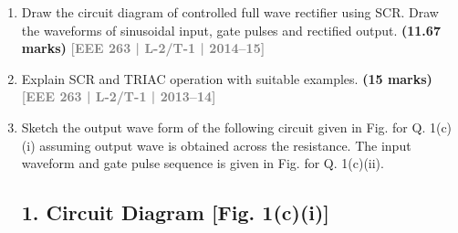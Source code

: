 \documentclass[12pt]{article}
\newcommand{\yr}[1]{\hfill\textcolor{gray}{\small\textbf{[#1]}}}
\newcommand{\mk}[1]{\textcolor{orange!70!black}{\small\textbf{(#1 marks)}}}
\begin{document}
\begin{enumerate}
    
\item  Draw the circuit diagram of controlled full wave rectifier using SCR. Draw the waveforms of sinusoidal input, gate pulses and rectified output.
\mk{11.67} \yr{EEE 263 | L-2/T-1 | 2014--15}


\item Explain SCR and TRIAC operation with suitable examples.
\mk{15} \yr{EEE 263 | L-2/T-1 | 2013--14}


\item Sketch the output wave form of the following circuit given in Fig. for Q. 1(c)(i) assuming output wave is obtained across the resistance. The input waveform and gate pulse sequence is given in Fig. for Q. 1(c)(ii). 

\subsection*{1. Circuit Diagram [Fig. 1(c)(i)]}
\begin{center}
\end{center}


\end{enumerate}
\end{document}
